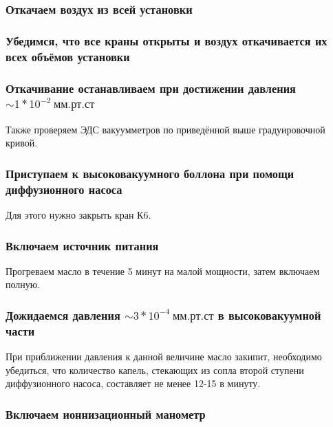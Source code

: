 \documentclass[a4paper, 12pt]{article}
\begin{document}
        \setcounter{subsubsection}{16}

        \subsubsection{Откачаем воздух из всей установки}

        \subsubsection{Убедимся, что все краны открыты и воздух откачивается их всех объёмов установки}

        \subsubsection{Откачивание останавливаем при достижении давления $\sim 1*10^{-2}~мм.рт.ст$}

            Также проверяем ЭДС вакуумметров по приведённой выше градуировочной кривой.

        \subsubsection{Приступаем к высоковакуумного боллона при помощи диффузионного насоса}

            Для этого нужно закрыть кран К6.

        \subsubsection{Включаем источник питания}

            Прогреваем масло в течение 5 минут на малой мощности, затем включаем полную.

        \subsubsection{Дожидаемся давления $ \sim 3*10^{-4}~мм.рт.ст$ в высоковакуумной части}

            При приближении давления к данной величине масло закипит, необходимо убедиться, что количество капель, стекающих из сопла второй ступени диффузионного насоса, составляет не менее 12-15 в минуту.

        \subsubsection{Включаем ионнизационный манометр}
\end{document}
